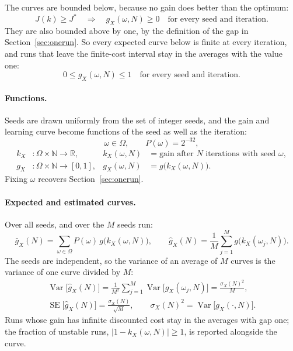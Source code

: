 \documentclass[11pt]{article}
\begin{document}
The curves are bounded below, because no gain does better than the optimum:
\[
  J(k) \ge J^* \quad\Longrightarrow\quad g_X(\omega, N) \ge 0 \quad \text{for every seed and iteration} .
\]
They are also bounded above by one, by the definition of the gap in Section~\ref{sec:onerun}. So
every expected curve below is finite at every iteration, and runs that leave the finite-cost
interval stay in the averages with the value one:
\[
  0 \le g_X(\omega, N) \le 1 \quad \text{for every seed and iteration} .
\]

\paragraph{Functions.} Seeds are drawn uniformly from the set of integer seeds, and the gain and
learning curve become functions of the seed as well as the iteration:
\[
  \omega \in \Omega, \qquad P(\omega) = 2^{-32},
\]
\begin{align*}
  k_X &: \Omega \times \mathbb{N} \to \mathbb{R}, &
    k_X(\omega, N) &= \text{gain after } N \text{ iterations with seed } \omega, \\
  g_X &: \Omega \times \mathbb{N} \to [0, 1], &
    g_X(\omega, N) &= g\big(k_X(\omega, N)\big).
\end{align*}
Fixing $\omega$ recovers Section~\ref{sec:onerun}.

\paragraph{Expected and estimated curves.} Over all seeds, and over the $M$ seeds run:
\[
  \bar g_X(N) = \sum_{\omega \in \Omega} P(\omega)\, g\big(k_X(\omega, N)\big), \qquad
  \hat g_X(N) = \frac{1}{M} \sum_{j=1}^{M} g\big(k_X(\omega_j, N)\big).
\]
The seeds are independent, so the variance of an average of $M$ curves is the variance of one curve
divided by $M$:
\begin{gather*}
  \operatorname{Var}\big[\hat g_X(N)\big] = \frac{1}{M^2} \sum_{j=1}^{M}
    \operatorname{Var}\big[g_X(\omega_j, N)\big] = \frac{\sigma_X(N)^2}{M}, \\
  \operatorname{SE}\big[\hat g_X(N)\big] = \frac{\sigma_X(N)}{\sqrt{M}}, \qquad
  \sigma_X(N)^2 = \operatorname{Var}\big[g_X(\cdot, N)\big].
\end{gather*}
Runs whose gain has infinite discounted cost stay in the averages with gap one; the fraction of
unstable runs, $|1 - k_X(\omega, N)| \ge 1$, is reported alongside the curve.
\end{document}
